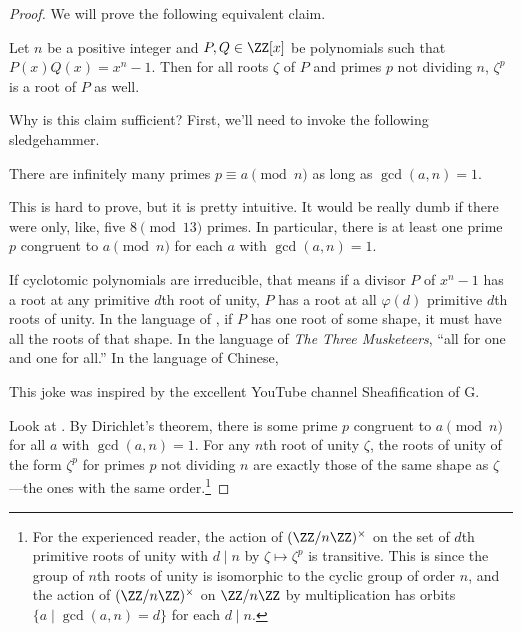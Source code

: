 \documentclass[11pt]{scrartcl}
\begin{document}
\begin{proof}
We will prove the following equivalent claim.
\begin{claim*}
	Let $n$ be a positive integer and $P,Q \in \ZZ[x]$ be polynomials such that $P(x)Q(x) = x^n - 1$. Then for all roots $\zeta$ of $P$ and primes $p$ not dividing $n$, $\zeta^p$ is a root of $P$ as well.
\end{claim*}

Why is this claim sufficient? First, we'll need to invoke the following sledgehammer.
\begin{theorem}
	There are infinitely many primes $p \equiv a \pmod n$ as long as $\gcd(a,n) = 1$.
\end{theorem}
This is hard to prove, but it is pretty intuitive. It would be really dumb if there were only, like, five $8 \pmod{13}$ primes. In particular, there is at least one prime $p$ congruent to $a \pmod n$ for each $a$ with $\gcd(a,n) = 1$.

If cyclotomic polynomials are irreducible, that means if a divisor $P$ of $x^n - 1$ has a root at any primitive $d$th root of unity, $P$ has a root at all $\varphi(d)$ primitive $d$th roots of unity. In the language of , if $P$ has one root of some shape, it must have all the roots of that shape. In the language of \emph{The Three Musketeers}, ``all for one and one for all.'' In the language of Chinese, 

\begin{remark*}
	This joke was inspired by the excellent YouTube channel Sheafification of G.
\end{remark*}

Look at . By Dirichlet's theorem, there is some prime $p$ congruent to $a \pmod n$ for all $a$ with $\gcd(a,n) = 1$. For any $n$th root of unity $\zeta$, the roots of unity of the form $\zeta^p$ for primes $p$ not dividing $n$ are exactly those of the same shape as $\zeta$---the ones with the same order.\footnote{
	For the experienced reader, the action of $(\ZZ/n\ZZ)^\times$ on the set of $d$th primitive roots of unity with $d \mid n$ by $\zeta \mapsto \zeta^p$ is transitive. This is since the group of $n$th roots of unity is isomorphic to the cyclic group of order $n$, and the action of $(\ZZ/n\ZZ)^\times$ on $\ZZ/n\ZZ$ by multiplication has orbits $\{a \mid \gcd(a,n) = d\}$ for each $d \mid n$.
}


\end{proof}
\end{document}

